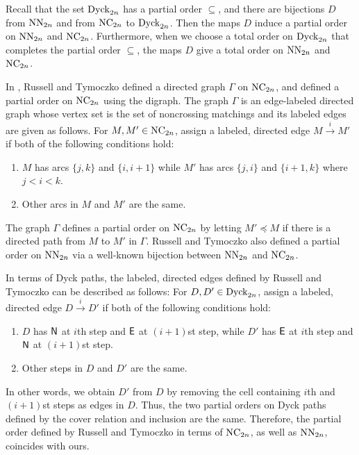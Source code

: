 Recall that the set \( \operatorname{Dyck}_{2n} \) has a partial order \( \subseteq \),
and there are bijections \( D \) from \( \operatorname{NN}_{2n} \) and from \( \operatorname{NC}_{2n} \) to
\( \operatorname{Dyck}_{2n} \).
Then the maps \( D \) induce a partial order on \( \operatorname{NN}_{2n} \) and \( \operatorname{NC}_{2n} \).
Furthermore, when we choose a total order on \( \operatorname{Dyck}_{2n} \) that completes
the partial order \( \subseteq \), the maps \( D \) give a total order
on \( \operatorname{NN}_{2n} \) and \( \operatorname{NC}_{2n} \).

\begin{rmk}
  In \cite{RT19}, Russell and Tymoczko defined a directed graph \( \Gamma \) on
  \( \operatorname{NC}_{2n} \), and defined a partial order on \( \operatorname{NC}_{2n} \) using the digraph.
  The graph \( \Gamma \) is an edge-labeled directed graph whose vertex set is
  the set of noncrossing matchings and its labeled edges are given as follows.
  For \( M,M'\in\operatorname{NC}_{2n} \), assign a labeled, directed edge $M \xrightarrow{i} M'$ if both of the following conditions hold:
  \begin{enumerate}[label=\roman*)]
    \item $M$ has arcs $\{j,k\}$ and $\{i,i+1\}$ while $M'$ has arcs $\{j,i\}$ and
    $\{i+1,k\}$ where \( j<i<k \).
    \item Other arcs in $M$ and $M'$ are the same.
  \end{enumerate}
  The graph $\Gamma$ defines a partial order on $\operatorname{NC}_{2n}$ by letting
  \(M'\preceq M\) if there is a directed path from $M$ to $M'$ in \(\Gamma\).
  Russell and Tymoczko also defined a partial order on \(\operatorname{NN}_{2n}\)
  via a well-known bijection between \( \operatorname{NN}_{2n} \) and \( \operatorname{NC}_{2n} \).

  In terms of Dyck paths, the labeled, directed edges defined by Russell and Tymoczko can be described as follows:
  For \( D,D'\in \operatorname{Dyck}_{2n} \), assign a labeled, directed edge \( D \xrightarrow{i} D' \) if both of the following conditions hold:
  \begin{enumerate}[label=\roman*)]
    \item \( D \) has \( \mathsf{N} \) at \( i \)th step and \( \mathsf{E} \) at \( (i+1) \)st step, while \( D' \) has \( \mathsf{E} \) at \( i \)th step and \( \mathsf{N} \) at \( (i+1) \)st step.
    \item Other steps in $D$ and $D'$ are the same.
  \end{enumerate}
  In other words, we obtain \( D' \) from \( D \) by removing the cell containing \( i \)th and \( (i+1) \)st steps as edges in \( D \).
  Thus, the two partial orders on Dyck paths defined by the cover relation and
  inclusion are the same.
  Therefore, the partial order defined by Russell and Tymoczko in terms of
  \( \operatorname{NC}_{2n} \), as well as \( \operatorname{NN}_{2n} \), coincides with ours.
\end{rmk}

